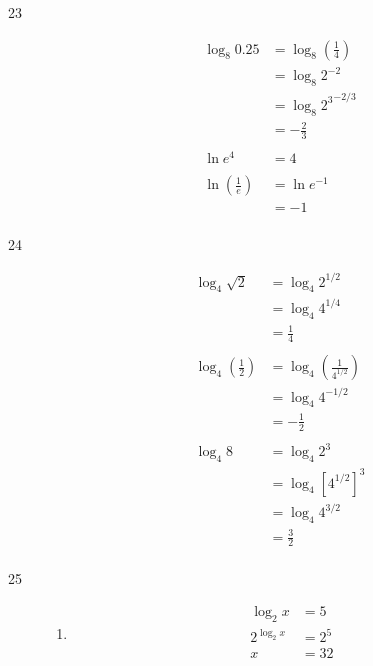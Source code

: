 \documentclass{exam}
\begin{document}
\begin{description}
    \item[23]
      \begin{align*}
        \log_{8} 0.25 &= \log_8 \left( \frac{1}{4} \right) \\
                      &= \log_8 2^{-2} \\
                      &= \log_8 {2^3}^{-2/3} \\
                      &= - \frac{2}{3} \\
        \\
        \ln e^4 &= 4 \\
        \\
        \ln \left( \frac{1}{e} \right) &= \ln e^{-1} \\
                                       &= -1 \\
      \end{align*}

    \item[24]
      \begin{align*}
        \log_4 \sqrt{2} &= \log_4 2^{1/2} \\
                        &= \log_4 4^{1/4} \\
                        &= \frac{1}{4} \\
        \\
        \log_4 \left( \frac{1}{2} \right) &= \log_4 \left( \frac{1}{4^{1/2}} \right) \\
                                          &= \log_4 4^{-1/2} \\
                                          &= - \frac{1}{2} \\
        \\
        \log_4 8 &= \log_4 2^3 \\
                 &= \log_4 \left[ 4^{1/2} \right]^3 \\
                 &= \log_4 4^{3/2} \\
                 &= \frac{3}{2} \\
      \end{align*}

    \item[25]
      \begin{enumerate}[a]
        \item 
          \begin{align*}
            \log_2 x     &= 5 \\
            2^{\log_2 x} &= 2^5 \\
            x            &= 32 \\
          \end{align*}


\end{enumerate}
\end{description}
\end{document}

